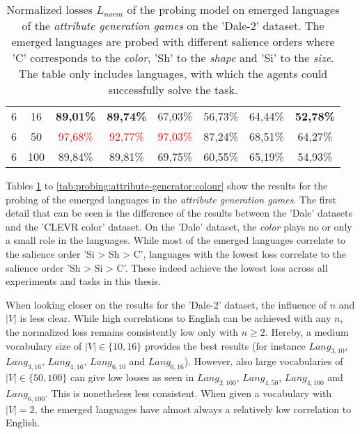 \begin{table}[ht]
\begin{tabular}{cc|c|c|c|c|c|c}
        {6} & {16}  & \textbf{89,01\%}         & \textbf{89,74\%}         & {67,03\%}                & {56,73\%}                & {64,44\%}                 & \textbf{52,78\%}          \\
        {6} & {50}  & \textcolor{red}{97,68\%} & \textcolor{red}{92,77\%} & \textcolor{red}{97,03\%} & {87,24\%}                & {68,51\%}                 & {64,27\%}                 \\
        {6} & {100} & {89,84\%}                & {89,81\%}                & {69,75\%}                & {60,55\%}                & {65,19\%}                 & {54,93\%}                 \\
        \bottomrule
    \end{tabular}
    \caption{Normalized losses $L_{norm}$ of the probing model on emerged languages of the \emph{attribute generation games} on the 'Dale-2' dataset. The emerged languages are probed with different salience orders where 'C' corresponds to the \emph{color}, 'Sh' to the \emph{shape} and 'Si' to the \emph{size}. The table only includes languages, with which the agents could successfully solve the task.}
    \label{tab:probing:attribute-generator:dale-2}
\end{table}

Tables \ref{tab:probing:attribute-generator:dale-2} to \ref{tab:probing:attribute-generator:colour} show the results for the probing of the emerged languages in the \emph{attribute generation games}.
The first detail that can be seen is the difference of the results between the 'Dale' datasets and the 'CLEVR color' dataset.
On the 'Dale' dataset, the \emph{color} plays no or only a small role in the languages.
While most of the emerged languages correlate to the salience order 'Si > Sh > C', languages with the lowest loss correlate to the salience order 'Sh > Si > C'.
These indeed achieve the lowest loss across all experiments and tasks in this thesis.

When looking closer on the results for the 'Dale-2' dataset, the influence of $n$ and $|V|$ is less clear.
While high correlations to English can be achieved with any $n$, the normalized loss remains consistently low only with $n \geq 2$.
Hereby, a medium vocabulary size of $|V| \in \{10,16\}$ provides the best results (for instance $Lang_{3,10}$, $Lang_{3,16}$, $Lang_{4,16}$, $Lang_{6,10}$ and $Lang_{6,16}$).
However, also large vocabularies of $|V| \in \{50,100\}$ can give low losses as seen in $Lang_{2,100}$, $Lang_{4,50}$, $Lang_{4,100}$ and $Lang_{6,100}$.
This is nonetheless less consistent.
When given a vocabulary with $|V|=2$, the emerged languages have almost always a relatively low correlation to English.

